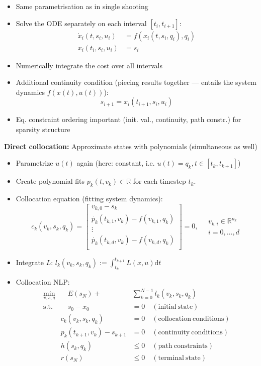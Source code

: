 \begin{tcolorbox}[colback=violet!5!white,colframe=violet!75!black,title=\textbf{Direct
    Approach}]
  \begin{itemize}
  \item Same parametrisation as in single shooting
  \item Solve the ODE separately on each interval $[t_i,t_{i+1}]$:
    \begin{align*}
      \dot{x}_i(t, s_i, u_i) &= f(x_i(t,s_i,q_i),q_i) \\
      x_i(t_i,s_i,u_i) &= s_i
    \end{align*}
  \item Numerically integrate the cost over all intervals
  \item Additional continuity condition (piecing results together --- entails
    the system dynamics $f(x(t),u(t))$):
    \[s_{i+1}=x_i(t_{i+1},s_i,u_i)\]
  \item Eq. constraint ordering important (init. val.,
    continuity, path constr.) for sparsity structure
  \end{itemize}
  \textbf{Direct collocation:} Approximate states with polynomials (simultaneous
  as well)\\
  \begin{itemize}
  \item Parametrize $u(t)$ again (here: constant, i.e. $u(t)=q_k, t\in [t_k,t_{k+1}]$)
  \item Create polynomial fits $p_k(t, v_k)\in \mathbb{R}$ for each timestep $t_k$.
  \item Collocation equation (fitting system dynamics):
    \[c_k(v_k,s_k,q_k)=
      \left[
        \begin{array}{c}
          v_{k,0}-s_k \\
          \dot{p_k}(t_{k,1},v_k) - f(v_{k,1}, q_k) \\
          \vdots \\
          \dot{p_k}(t_{k,d},v_k) - f(v_{k,d}, q_k) \\
        \end{array}
      \right]=0,
      \quad
      \begin{array}{c}
        v_{k,i}\in \mathbb{R}^{n_x}\\
        i=0, \dots, d
      \end{array}
    \]
  \item Integrate $L$: $l_k(v_k,s_k,q_k) := \int^{t_{k+1}}_{t_k} L(x,u)\mathrm{d}t$
\item Collocation NLP:
\[
  \begin{array}{rrl}
    \min_{v,s,q}&\quad  E(s_N) + &\sum^{N-1}_{k=0} l_k(v_k,s_k,q_k) \\
    \mathrm{s.t.}&\quad s_0 - x_0 &= 0\quad \mathrm{(initial\ state)} \\
    &c_k(v_k,s_k,q_k) &= 0 \quad \mathrm{(collocation\ conditions)} \\ 
    &p_k(t_{k+1},v_k) - s_{k+1} &= 0\quad \mathrm{(continuity\ conditions)} \\
    &h(s_k,q_k)&\le 0\quad \mathrm{(path\ constraints)} \\
    & r(s_N) &\le 0\quad \mathrm{(terminal\ state)}
  \end{array}
\]
  \end{itemize}
\end{tcolorbox}

